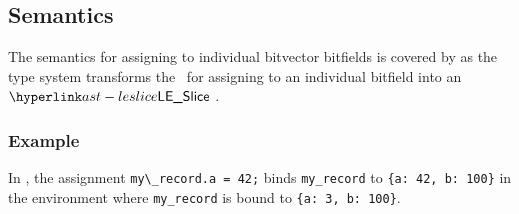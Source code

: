 \begin{mathpar}
\end{mathpar}

\subsection{Semantics}
The semantics for assigning to individual bitvector bitfields is covered by 
as the type system transforms the \untypedast\ for assigning to an individual bitfield into an $\LESlice$ \typedast.


\subsubsection{Example}
In , the assignment
\verb|my\_record.a = 42;| binds \texttt{my\_record} to \texttt{\{a: 42, b: 100\}}
in the environment where \texttt{my\_record} is bound to \texttt{\{a: 3, b: 100\}}.

